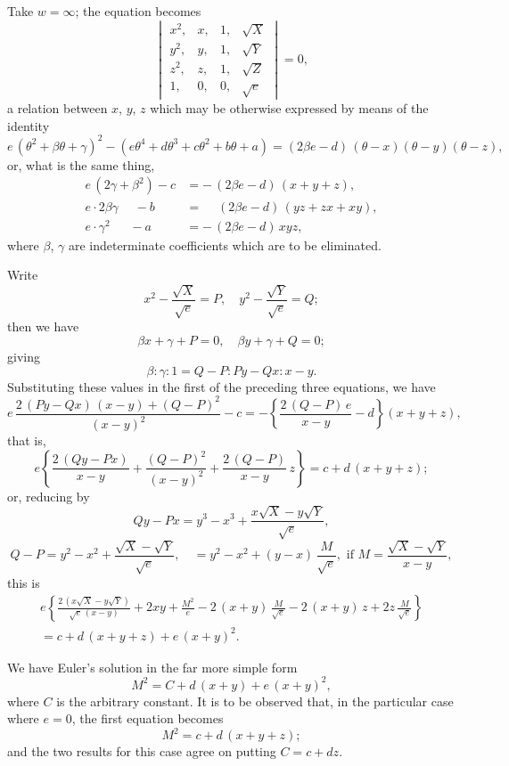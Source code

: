 \documentclass[12pt,a4paper]{article}
\begin{document}
\noindent
Take $w = \infty$; the equation becomes
\[
\begin{vmatrix}
x^2, & x, & 1, & \surd X \\
y^2, & y, & 1, & \surd Y \\
z^2, & z, & 1, & \surd Z \\
1, & 0, & 0, & \surd e
\end{vmatrix} = 0,
\]
a relation between $x$, $y$, $z$ which may be otherwise expressed by means of the identity
\[
e\,(\theta^2 + \beta\theta + \gamma)^2 - (e\theta^4 + d\theta^3 + c\theta^2 + b\theta + a) = (2\beta e - d)\,(\theta - x)(\theta - y)(\theta - z),
\]
or, what is the same thing,
\begin{align*}
e\,(2\gamma + \beta^2) - c &= -\,(2\beta e - d)\,(x+y+z), \\
e \cdot 2\beta\gamma \quad\; - b &= \phantom{-}(2\beta e - d)\,(yz + zx + xy), \\
e \cdot \gamma^2 \quad\;\; - a &= -\,(2\beta e - d)\,xyz,
\end{align*}
where $\beta$, $\gamma$ are indeterminate coefficients which are to be eliminated.

Write
\[
x^2 - \frac{\surd X}{\surd e} = P, \quad y^2 - \frac{\surd Y}{\surd e} = Q;
\]
then we have
\[
\beta x + \gamma + P = 0, \quad \beta y + \gamma + Q = 0;
\]
giving
\[
\beta : \gamma : 1 = Q - P : Py - Qx : x - y.
\]
Substituting these values in the first of the preceding three equations, we have
\[
e\,\frac{2\,(Py - Qx)\,(x-y) + (Q-P)^2}{(x-y)^2} - c = -\left\{\frac{2\,(Q-P)\,e}{x-y} - d\right\}(x+y+z),
\]
that is,
\[
e\left\{\frac{2\,(Qy - Px)}{x-y} + \frac{(Q-P)^2}{(x-y)^2} + \frac{2\,(Q-P)}{x-y}\,z\right\} = c + d\,(x+y+z);
\]
or, reducing by
\[
Qy - Px = y^3 - x^3 + \frac{x\surd X - y\surd Y}{\surd e},
\]
\[
Q - P = y^2 - x^2 + \frac{\surd X - \surd Y}{\surd e}, \quad = y^2 - x^2 + (y-x)\,\frac{M}{\surd e}, \text{ if } M = \frac{\surd X - \surd Y}{x-y},
\]
this is
\begin{multline*}
e\left\{\frac{2\,(x\surd X - y\surd Y)}{\surd e\,(x-y)} + 2xy + \frac{M^2}{e} - 2\,(x+y)\,\frac{M}{\surd e} - 2\,(x+y)\,z + 2z\,\frac{M}{\surd e}\right\} \\
= c + d\,(x+y+z) + e\,(x+y)^2.
\end{multline*}

We have Euler's solution in the far more simple form
\[
M^2 = C + d\,(x+y) + e\,(x+y)^2,
\]
where $C$ is the arbitrary constant. It is to be observed that, in the particular case where $e = 0$, the first equation becomes
\[
M^2 = c + d\,(x+y+z);
\]
and the two results for this case agree on putting $C = c + dz$.
\end{document}
